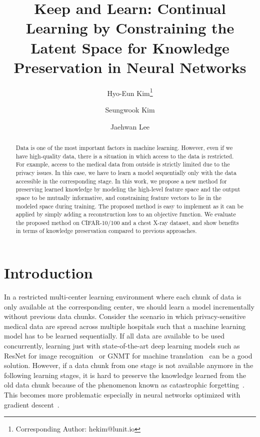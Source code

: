 \documentclass[runningheads,a4paper]{llncs}
\begin{document}
\mainmatter  %

\title{Keep and Learn: Continual Learning by Constraining the Latent Space for Knowledge Preservation in Neural Networks}

\author{Hyo-Eun Kim\thanks{Corresponding Author: hekim@lunit.io}\and Seungwook Kim\and Jaehwan Lee}




\maketitle


\begin{abstract}
Data is one of the most important factors in machine learning. However, even if we have high-quality data, there is a situation in which access to the data is restricted. For example, access to the medical data from outside is strictly limited due to the privacy issues. In this case, we have to learn a model sequentially only with the data accessible in the corresponding stage. In this work, we propose a new method for preserving learned knowledge by modeling the high-level feature space and the output space to be mutually informative, and constraining feature vectors to lie in the modeled space during training. The proposed method is easy to implement as it can be applied by simply adding a reconstruction loss to an objective function. We evaluate the proposed method on CIFAR-10/100 and a chest X-ray dataset, and show benefits in terms of knowledge preservation compared to previous approaches.
\end{abstract}


\section{Introduction}

In a restricted multi-center learning environment where each chunk of data is only available at the corresponding center, we should learn a model incrementally without previous data chunks. Consider the scenario in which privacy-sensitive medical data are spread across multiple hospitals such that a machine learning model has to be learned sequentially.
If all data are available to be used concurrently, learning just with state-of-the-art deep learning models such as ResNet for image recognition~\cite{r07_resnet_cvpr2016} or GNMT for machine translation~\cite{r08_gnmt_arxiv2016} can be a good solution. However, if a data chunk from one stage is not available anymore in the following learning stages, it is hard to preserve the knowledge learned from the old data chunk because of the phenomenon known as catastrophic forgetting~\cite{r02_catastrophic_iclr2014}. This becomes more problematic especially in neural networks optimized with gradient descent~\cite{r01_catastrophic_psy1989}.
\end{document}
